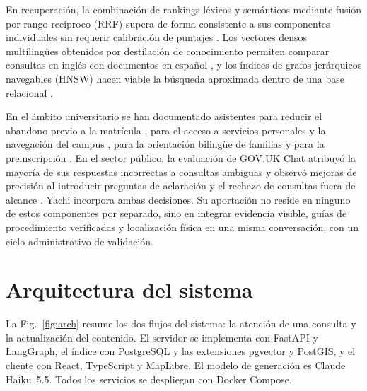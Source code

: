 \documentclass[conference]{IEEEtran}
\begin{document}
En recuperación, la combinación de rankings léxicos y semánticos mediante fusión por rango recíproco (RRF) supera de forma consistente a sus componentes individuales sin requerir calibración de puntajes \cite{cormack2009rrf}. Los vectores densos multilingües obtenidos por destilación de conocimiento permiten comparar consultas en inglés con documentos en español \cite{reimers2020multilingual}, y los índices de grafos jerárquicos navegables (HNSW) hacen viable la búsqueda aproximada dentro de una base relacional \cite{malkov2020hnsw}.

En el ámbito universitario se han documentado asistentes para reducir el abandono previo a la matrícula \cite{pounce}, para el acceso a servicios personales y la navegación del campus \cite{genie}, para la orientación bilingüe de familias \cite{sunny} y para la preinscripción \cite{lola}. En el sector público, la evaluación de GOV.UK Chat atribuyó la mayoría de sus respuestas incorrectas a consultas ambiguas y observó mejoras de precisión al introducir preguntas de aclaración y el rechazo de consultas fuera de alcance \cite{govuk2026}. Yachi incorpora ambas decisiones. Su aportación no reside en ninguno de estos componentes por separado, sino en integrar evidencia visible, guías de procedimiento verificadas y localización física en una misma conversación, con un ciclo administrativo de validación.

\section{Arquitectura del sistema}
\label{sec:arch}

La Fig.~\ref{fig:arch} resume los dos flujos del sistema: la atención de una consulta y la actualización del contenido. El servidor se implementa con FastAPI y LangGraph, el índice con PostgreSQL y las extensiones pgvector y PostGIS, y el cliente con React, TypeScript y MapLibre. El modelo de generación es Claude Haiku~5.5. Todos los servicios se despliegan con Docker Compose.
\end{document}
